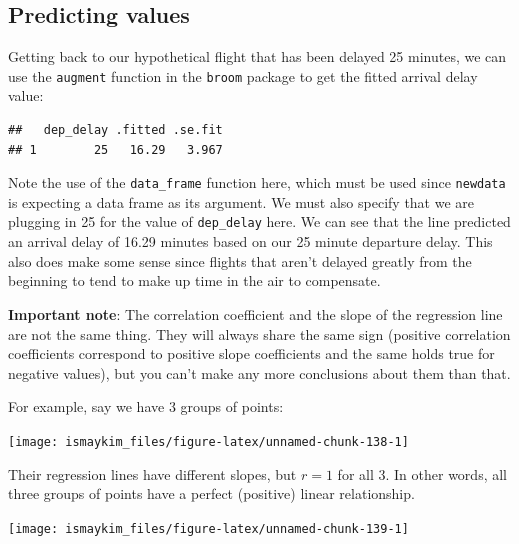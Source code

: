 \documentclass[]{tufte-book}
\newenvironment{Shaded}{\begin{snugshade}}{\end{snugshade}}
\newcommand{\KeywordTok}[1]{\textcolor[rgb]{0.13,0.29,0.53}{\textbf{{#1}}}}
\newcommand{\DataTypeTok}[1]{\textcolor[rgb]{0.13,0.29,0.53}{{#1}}}
\newcommand{\DecValTok}[1]{\textcolor[rgb]{0.00,0.00,0.81}{{#1}}}
\newcommand{\StringTok}[1]{\textcolor[rgb]{0.31,0.60,0.02}{{#1}}}
\newcommand{\NormalTok}[1]{{#1}}
\theoremstyle{definition}
\theoremstyle{definition}
\theoremstyle{remark}
\begin{document}
\subsection{Predicting values}\label{predicting-values}

Getting back to our hypothetical flight that has been delayed 25
minutes, we can use the \texttt{augment} function in the \texttt{broom}
package to get the fitted arrival delay value:

\begin{Shaded}
\end{Shaded}

\begin{verbatim}
##   dep_delay .fitted .se.fit
## 1        25   16.29   3.967
\end{verbatim}

Note the use of the \texttt{data\_frame} function here, which must be
used since \texttt{newdata} is expecting a data frame as its argument.
We must also specify that we are plugging in 25 for the value of
\texttt{dep\_delay} here. We can see that the line predicted an arrival
delay of 16.29 minutes based on our 25 minute departure delay. This also
does make some sense since flights that aren't delayed greatly from the
beginning to tend to make up time in the air to compensate.

\textbf{Important note}: The correlation coefficient and the slope of
the regression line are not the same thing. They will always share the
same sign (positive correlation coefficients correspond to positive
slope coefficients and the same holds true for negative values), but you
can't make any more conclusions about them than that.

For example, say we have 3 groups of points:

\begin{center}\texttt{[image: ismaykim\_files/figure-latex/unnamed-chunk-138-1]} \end{center}

Their regression lines have different slopes, but \(r = 1\) for all 3.
In other words, all three groups of points have a perfect (positive)
linear relationship.

\begin{center}\texttt{[image: ismaykim\_files/figure-latex/unnamed-chunk-139-1]} \end{center}
\end{document}
